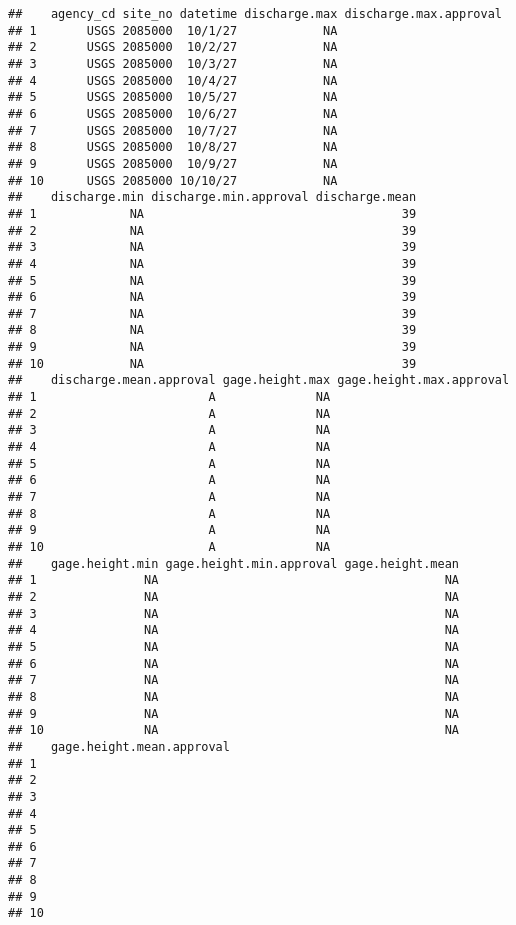 \documentclass[]{article}
\begin{document}
\begin{verbatim}
##    agency_cd site_no datetime discharge.max discharge.max.approval
## 1       USGS 2085000  10/1/27            NA                       
## 2       USGS 2085000  10/2/27            NA                       
## 3       USGS 2085000  10/3/27            NA                       
## 4       USGS 2085000  10/4/27            NA                       
## 5       USGS 2085000  10/5/27            NA                       
## 6       USGS 2085000  10/6/27            NA                       
## 7       USGS 2085000  10/7/27            NA                       
## 8       USGS 2085000  10/8/27            NA                       
## 9       USGS 2085000  10/9/27            NA                       
## 10      USGS 2085000 10/10/27            NA                       
##    discharge.min discharge.min.approval discharge.mean
## 1             NA                                    39
## 2             NA                                    39
## 3             NA                                    39
## 4             NA                                    39
## 5             NA                                    39
## 6             NA                                    39
## 7             NA                                    39
## 8             NA                                    39
## 9             NA                                    39
## 10            NA                                    39
##    discharge.mean.approval gage.height.max gage.height.max.approval
## 1                        A              NA                         
## 2                        A              NA                         
## 3                        A              NA                         
## 4                        A              NA                         
## 5                        A              NA                         
## 6                        A              NA                         
## 7                        A              NA                         
## 8                        A              NA                         
## 9                        A              NA                         
## 10                       A              NA                         
##    gage.height.min gage.height.min.approval gage.height.mean
## 1               NA                                        NA
## 2               NA                                        NA
## 3               NA                                        NA
## 4               NA                                        NA
## 5               NA                                        NA
## 6               NA                                        NA
## 7               NA                                        NA
## 8               NA                                        NA
## 9               NA                                        NA
## 10              NA                                        NA
##    gage.height.mean.approval
## 1                           
## 2                           
## 3                           
## 4                           
## 5                           
## 6                           
## 7                           
## 8                           
## 9                           
## 10
\end{verbatim}
\end{document}
